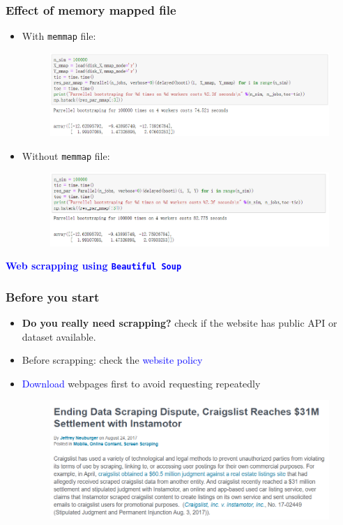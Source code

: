 \documentclass[red]{beamer}
\begin{document}
\begin{frame}
\frametitle{Effect of memory mapped file}
\begin{itemize}
	\item With \texttt{memmap} file:
	\begin{figure}
		\centering
		\includegraphics[width=1\linewidth]{figure/screenshot037}
	\end{figure}
	
	\item Without  \texttt{memmap} file:
	\begin{figure}
		\centering
		\includegraphics[width=1\linewidth]{figure/screenshot038}
	\end{figure}
\end{itemize}
\end{frame}
\begin{frame}
\centering
\LARGE \textcolor{blue}{\textbf{Web scrapping using \texttt{Beautiful Soup}}}
\end{frame}

\begin{frame}
\frametitle{Before you start}
\begin{itemize}
	\item \textbf{Do you really need scrapping?} check if the website has public API or dataset available.
	\item Before scrapping: check the \textcolor{blue}{website policy}
	\item \textcolor{blue}{Download} webpages first to avoid requesting repeatedly
	\begin{figure}
		\centering
		\includegraphics[width=1\linewidth]{figure/screenshot039}
	\end{figure}
	
\end{itemize}
\end{frame}
\end{document}

